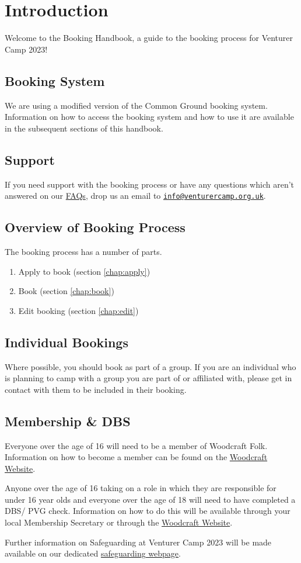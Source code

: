 \chapter{Introduction}

Welcome to the Booking Handbook, a guide to the booking process for Venturer Camp 2023!

\section{Booking System}
We are using a modified version of the Common Ground booking system. Information on how to access the booking system and how to use it are available in the subsequent sections of this handbook.

\section{Support}
If you need support with the booking process or have any questions which aren't answered on our \href{https://venturercamp.org.uk/book}{FAQs}, drop us an email to \href{mailto:info@venturercamp.org.uk}{\texttt{info@venturercamp.org.uk}}.

\section{Overview of Booking Process}
The booking process has a number of parts.
\begin{enumerate}
    \item Apply to book (section \ref*{chap:apply})
    \item Book (section \ref*{chap:book})
    \item Edit booking (section \ref*{chap:edit})
\end{enumerate}

\section{Individual Bookings}
Where possible, you should book as part of a group. If you are an individual who is planning to camp with a group you are part of or affiliated with, please get in contact with them to be included in their booking. 

\section{Membership \& DBS}
Everyone over the age of 16 will need to be a member of Woodcraft Folk. Information on how to become a member can be found on the \href{https://woodcraft.org.uk/group-guidance/support-advice/membership/}{Woodcraft Website}.

Anyone over the age of 16 taking on a role in which they are responsible for under 16 year olds and everyone over the age of 18 will need to have completed a DBS/ PVG check. Information on how to do this will be available through your local Membership Secretary or through the \href{https://woodcraft.org.uk/resources/volunteer-screening/}{Woodcraft Website}.

Further information on Safeguarding at Venturer Camp 2023 will be made available on our dedicated \href{https://venturercamp.org.uk/safeguarding}{safeguarding webpage}.